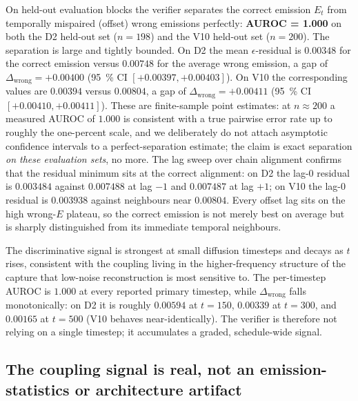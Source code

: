 On held-out evaluation blocks the verifier separates the correct emission $E_t$
from temporally mispaired (offset) wrong emissions perfectly:
\textbf{AUROC = 1.000} on both the D2 held-out set ($n=198$) and the V10 held-out
set ($n=200$). The separation is large and tightly bounded. On D2 the mean
$\epsilon$-residual is $0.00348$ for the correct emission versus $0.00748$ for
the average wrong emission, a gap of $\Delta_{\text{wrong}} = +0.00400$
(\SI{95}{\percent} CI $[+0.00397, +0.00403]$). On V10 the corresponding values
are $0.00394$ versus $0.00804$, a gap of $\Delta_{\text{wrong}} = +0.00411$
(\SI{95}{\percent} CI $[+0.00410, +0.00411]$). These are finite-sample point
estimates: at $n \approx 200$ a measured AUROC of $1.000$ is consistent with a
true pairwise error rate up to roughly the one-percent scale, and we
deliberately do not attach asymptotic confidence intervals to a
perfect-separation estimate; the claim is exact separation \emph{on these
evaluation sets}, no more. The lag sweep over chain
alignment confirms that the residual minimum sits at the correct alignment: on
D2 the lag-0 residual is $0.003484$ against $0.007488$ at lag $-1$ and $0.007487$
at lag $+1$; on V10 the lag-0 residual is $0.003938$ against neighbours near
$0.00804$. Every offset lag sits on the high wrong-$E$ plateau, so the correct
emission is not merely best on average but is sharply distinguished from its
immediate temporal neighbours.

The discriminative signal is strongest at small diffusion timesteps and decays
as $t$ rises, consistent with the coupling living in the higher-frequency
structure of the capture that low-noise reconstruction is most sensitive to. The
per-timestep AUROC is $1.000$ at every reported primary timestep, while
$\Delta_{\text{wrong}}$ falls monotonically: on D2 it is roughly $0.00594$ at
$t=150$, $0.00339$ at $t=300$, and $0.00165$ at $t=500$ (V10 behaves
near-identically). The verifier is therefore not relying on a single timestep;
it accumulates a graded, schedule-wide signal.

\subsection{The coupling signal is real, not an emission-statistics or architecture artifact}
\label{sec:results_main_control}

